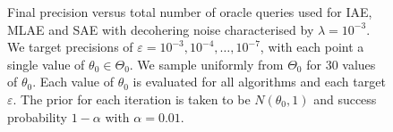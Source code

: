 \begin{figure}[htbp]
	\centering
	\caption{Final precision versus total number of oracle queries used for IAE, MLAE and SAE with decohering noise characterised by $\lambda = 10^{-3}$. We target precisions of $\varepsilon = 10^{-3}, 10^{-4}, \ldots , 10^{-7}$, with each point a single value of $\theta_0 \in \Theta_0$. We sample uniformly from $\Theta_0$ for 30 values of $\theta_0$. Each value of $\theta_0$ is evaluated for all algorithms and each target $\varepsilon$. The prior for each iteration is taken to be $N(\theta_0, 1)$ and success probability $1 - \alpha$ with $\alpha = 0.01$.}
	\label{fig::query-comparison-noisy}
\end{figure}

\newpage



%
%
%
%
